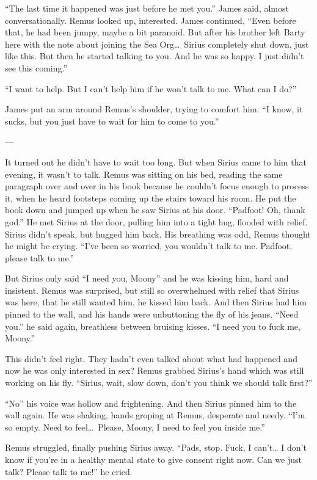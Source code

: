 \documentclass[12pt,twoside,openright]{memoir}
\begin{document}
``The last time it happened was just before he met you.'' James said, almost conversationally. Remus looked up, interested. James continued, ``Even before that, he had been jumpy, maybe a bit paranoid. But after his brother left Barty here with the note about joining the Sea Org\ldots\ Sirius completely shut down, just like this. But then he started talking to you. And he was so happy. I just didn't see this coming.'' 

``I want to help. But I can't help him if he won't talk to me. What can I do?'' 

James put an arm around Remus's shoulder, trying to comfort him. ``I know, it sucks, but you just have to wait for him to come to you.''

---

It turned out he didn't have to wait too long. But when Sirius came to him that evening, it wasn't to talk. Remus was sitting on his bed, reading the same paragraph over and over in his book because he couldn't focus enough to process it, when he heard footsteps coming up the stairs toward his room. He put the book down and jumped up when he saw Sirius at his door. ``Padfoot! Oh, thank god.'' He met Sirius at the door, pulling him into a tight hug, flooded with relief. Sirius didn't speak, but hugged him back. His breathing was odd, Remus thought he might be crying. ``I've been so worried, you wouldn't talk to me. Padfoot, please talk to me.''

But Sirius only said ``I need you, Moony'' and he was kissing him, hard and insistent. Remus was surprised, but still so overwhelmed with relief that Sirius was here, that he still wanted him, he kissed him back. And then Sirius had him pinned to the wall, and his hands were unbuttoning the fly of his jeans. ``Need you.'' he said again, breathless between bruising kisses. ``I need you to fuck me, Moony.''

This didn't feel right. They hadn't even talked about what had happened and now he was only interested in sex? Remus grabbed Sirius's hand which was still working on his fly. ``Sirius, wait, slow down, don't you think we should talk first?''

``No'' his voice was hollow and frightening. And then Sirius pinned him to the wall again. He was shaking, hands groping at Remus, desperate and needy. ``I'm so empty. Need to feel\ldots\ Please, Moony, I need to feel you inside me.'' 

Remus struggled, finally pushing Sirius away. ``Pads, stop. Fuck, I can't… I don't know if you're in a healthy mental state to give consent right now. Can we just talk? Please talk to me!'' he cried. 
\end{document}
